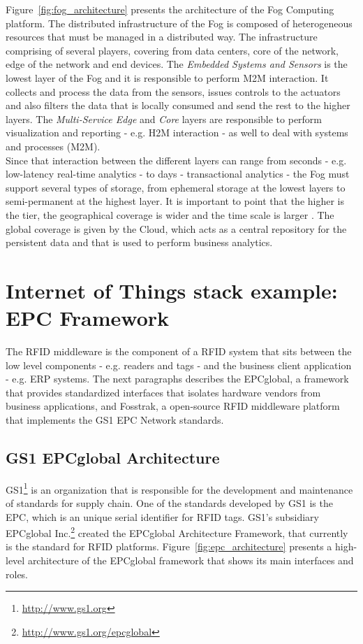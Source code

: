 Figure~\ref{fig:fog_architecture} presents the architecture of the Fog Computing platform.
The distributed infrastructure of the Fog is composed of heterogeneous resources that must be managed
in a distributed way. The infrastructure comprising of several players, covering from data centers,
core of the network, edge of the network and end devices. The \textit{Embedded Systems and Sensors} is
the lowest layer of the Fog and it is responsible to perform \gls{M2M} interaction. It collects and
process the data from the sensors, issues controls to the actuators and also filters the data that
is locally consumed and send the rest to the higher layers. The \textit{Multi-Service Edge} and
\textit{Core} layers are responsible to perform visualization and reporting - e.g. \gls{H2M} interaction -
as well to deal with systems and processes (\gls{M2M}).\\

Since that interaction between the different layers can range from seconds - e.g. low-latency real-time
analytics - to days - transactional analytics - the Fog must support several types of storage, from
ephemeral storage at the lowest layers to semi-permanent at the highest layer. It is important to point
that the higher is the tier, the geographical coverage is wider and the time scale is larger \cite{bonomi2014fog}.
The global coverage is given by the Cloud, which acts as a central repository for the persistent data
and that is used to perform business analytics.

\section{Internet of Things stack example: EPC Framework}
\label{sec:iot_stack}
The \gls{RFID} middleware is the component of a \gls{RFID} system that sits between the low level
components - e.g. readers and tags - and the business client application - e.g. \gls{ERP} systems.
The next paragraphs describes the EPCglobal, a framework that provides standardized interfaces that
isolates hardware vendors from business applications, and Fosstrak, a open-source \gls{RFID}
middleware platform that implements the GS1 \gls{EPC} Network standards.

\subsection{GS1 EPCglobal Architecture}
\label{subs:epc_network}
GS1\footnote{\url{http://www.gs1.org}} is an organization that is responsible for the development and maintenance of standards for
supply chain. One of the standards developed by GS1 is the \gls{EPC}, which is an unique serial identifier
for \gls{RFID} tags. GS1's subsidiary EPCglobal Inc.\footnote{\url{http://www.gs1.org/epcglobal}} created
the EPCglobal Architecture Framework, that currently is the standard for \gls{RFID} platforms.
Figure~\ref{fig:epc_architecture} presents a high-level architecture of the EPCglobal framework
that shows its main interfaces and roles.\\

